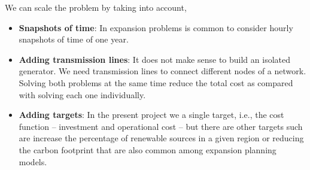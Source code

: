 We can scale the problem by taking into account,
\begin{itemize}
    \item \textbf{Snapshots of time}: In expansion problems is common to consider hourly snapshots of time of one year.
    \item \textbf{Adding transmission lines}: It does not make sense to build an isolated generator. We need transmission lines to connect different nodes of a network. Solving both problems at the same time reduce the total cost as compared with solving each one individually.
    \item \textbf{Adding targets}: In the present project we a single target, i.e., the cost function -- investment and operational cost -- but there are other targets such are increase the percentage of renewable sources in a given region or reducing the carbon footprint that are also common among expansion planning models.
\end{itemize}